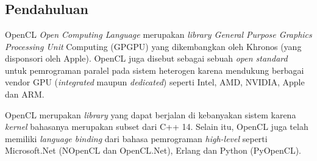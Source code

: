\chapter{\topikDua}

\section{Pendahuluan}

OpenCL \textit{Open Computing Language} merupakan \textit{library General Purpose Graphics Processing Unit} Computing (GPGPU) yang dikembangkan oleh Khronos (yang disponsori oleh Apple). OpenCL juga disebut sebagai sebuah \textit{open standard} untuk pemrograman paralel pada sistem heterogen karena mendukung berbagai vendor GPU (\textit{integrated} maupun \textit{dedicated}) seperti Intel, AMD, NVIDIA, Apple dan ARM.

OpenCL merupakan \textit{library} yang dapat berjalan di kebanyakan sistem karena \textit{kernel} bahasanya merupakan subset dari C++ 14. Selain itu, OpenCL juga telah memiliki \textit{language binding} dari bahasa pemrograman \textit{high-level} seperti Microsoft.Net (NOpenCL dan OpenCL.Net), Erlang dan Python (PyOpenCL).